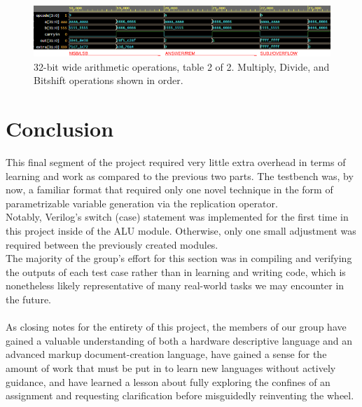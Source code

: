 \documentclass[12pt]{article}
\begin{document}
    \begin{figure}[H]
        \centering
        \includegraphics[width = 1.0\textwidth]{figs/CompArch Final Test Cases 32x labeled OPERATIONS (resized 2 of 2).png}
        \caption{32-bit wide arithmetic operations, table 2 of 2. Multiply, Divide, and Bitshift operations shown in order.}
        \label{fig:enter-label}
    \end{figure}



\section{Conclusion}
This final segment of the project required very little extra overhead in terms of learning and work as compared to the previous two parts. The testbench was, by now, a familiar format that required only one novel technique in the form of parametrizable variable generation via the replication operator. \\

Notably, Verilog's switch (case) statement was implemented for the first time in this project inside of the ALU module. Otherwise, only one small adjustment was required between the previously created modules. \\
The majority of the group's effort for this section was in compiling and verifying the outputs of each test case rather than in learning and writing code, which is nonetheless likely representative of many real-world tasks we may encounter in the future. \\ 
\\
As closing notes for the entirety of this project, the members of our group have gained a valuable understanding of both a hardware descriptive language and an advanced markup document-creation language, have gained a sense for the amount of work that must be put in to learn new languages without actively guidance, and have learned a lesson about fully exploring the confines of an assignment and requesting clarification before misguidedly reinventing the wheel.
\end{document}
